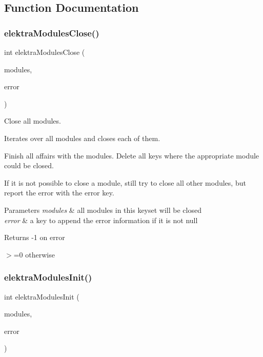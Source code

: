 \subsection{Function Documentation}
\mbox{\label{group__modules_ga5646d92ffe3e1e04c4586d9c910ba6bd}} 
\subsubsection{\texorpdfstring{elektraModulesClose()}{elektraModulesClose()}}
{\footnotesize\ttfamily int elektra\+Modules\+Close (\begin{DoxyParamCaption}\item[{Key\+Set $\ast$}]{modules,  }\item[{Key $\ast$}]{error }\end{DoxyParamCaption})}



Close all modules. 

Iterates over all modules and closes each of them.

Finish all affairs with the modules. Delete all keys where the appropriate module could be closed.

If it is not possible to close a module, still try to close all other modules, but report the error with the error key.


\begin{DoxyParams}{Parameters}
{\em modules} & all modules in this keyset will be closed \\
\hline
{\em error} & a key to append the error information if it is not null \\
\hline
\end{DoxyParams}
\begin{DoxyReturn}{Returns}
-\/1 on error 

$>$=0 otherwise 
\end{DoxyReturn}
\mbox{\label{group__modules_gaa40915e67f973ccd5258aa450bd03585}} 
\subsubsection{\texorpdfstring{elektraModulesInit()}{elektraModulesInit()}}
{\footnotesize\ttfamily int elektra\+Modules\+Init (\begin{DoxyParamCaption}\item[{Key\+Set $\ast$}]{modules,  }\item[{Key $\ast$}]{error }\end{DoxyParamCaption})}



